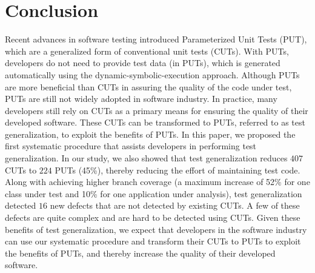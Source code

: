 \section{Conclusion}
\label{sec:conclusion}

Recent advances in software testing introduced Parameterized Unit Tests (PUT), which are a generalized form of conventional unit tests (CUTs). With PUTs, developers do not need to provide test data (in PUTs), which is generated automatically using the dynamic-symbolic-execution approach. Although PUTs are more beneficial than CUTs in assuring the quality of the code under test, PUTs are still not widely adopted in software industry. In practice, many developers still rely on CUTs as a primary means for ensuring the quality of their developed software. These CUTs can be transformed to PUTs, referred to as test generalization, to exploit the benefits of PUTs. In this paper, we proposed the first systematic procedure that assists developers in performing test generalization. In our study, we also showed that test generalization reduces $407$ CUTs to $224$ PUTs (45\%), thereby reducing the effort of maintaining test code. Along with achieving higher branch coverage (a maximum increase of 52\% for one class under test and 10\% for one application under analysis), test generalization detected $16$ new defects that are not detected by existing CUTs. A few of these defects are quite complex and are hard to be detected using CUTs. Given these benefits of test generalization, we expect that developers in the software industry can use our systematic procedure and transform their CUTs to PUTs to exploit the benefits of PUTs, and thereby increase the quality of their developed software.

